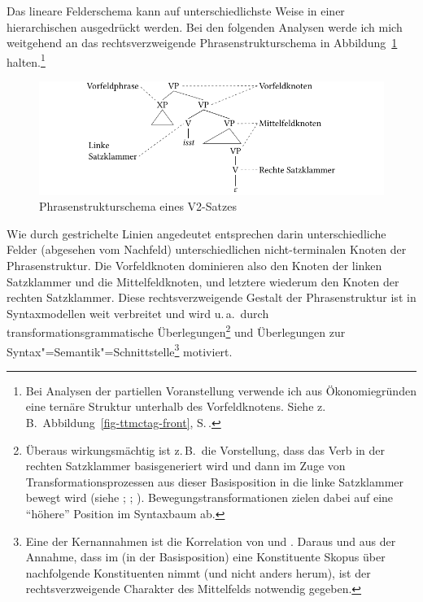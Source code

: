 Das lineare Felderschema kann auf unterschiedlichste Weise in einer hierarchischen  ausgedrückt werden. Bei den folgenden Analysen werde ich mich weitgehend an das rechtsverzweigende Phrasenstrukturschema in Abbildung~\ref{fig-ttmctag-ps-1} halten.\footnote{Bei Analysen der partiellen Voranstellung verwende ich aus Ökonomiegründen eine ternäre Struktur unterhalb des Vorfeldknotens. Siehe z.\,B.\ Abbildung~\ref{fig-ttmctag-front}, S.\,\pageref{fig-ttmctag-front}.}
\begin{figure}[t]
\centering
\includegraphics{graphics/abb75.pdf}
\caption{\label{fig-ttmctag-ps-1} Phrasenstrukturschema eines V2-Satzes}
\end{figure} 
Wie durch gestrichelte Linien angedeutet entsprechen darin unterschiedliche Felder (abgesehen vom Nachfeld) unterschiedlichen nicht-termi\-nalen Knoten der Phrasenstruktur. Die Vorfeldknoten dominieren also den Knoten der linken Satzklammer und die Mittelfeldknoten, und letztere wiederum den Knoten der rechten Satzklammer. Diese rechtsverzweigende Gestalt der Phrasenstruktur ist in Syntaxmodellen weit verbreitet und wird u.\,a.\ durch transformationsgrammatische Überlegungen\footnote{Überaus wirkungsmächtig  ist z.\,B.\ die Vorstellung, dass das Verb in der rechten Satzklammer basisgeneriert wird und dann im Zuge von Transformationsprozessen aus dieser Basisposition in die linke Satzklammer bewegt wird (siehe \citealt[Abschnitt~2.2.2]{Stechow:Sternefeld:88}; \citealt[Abschnitte~III.4 und III.5]{Sternefeld:06}; \citealt[Abschnitt~3.2]{Mueller:10}). Bewegungstransformationen zielen dabei auf eine "`höhere"' Position im Syntaxbaum ab.} und Überlegungen zur Syntax"=Semantik"=Schnittstelle\footnote{Eine der Kernannahmen ist die Korrelation von  und . Daraus und aus der Annahme, dass im  (in der Basisposition) eine Konstituente Skopus über nachfolgende Konstituenten nimmt (und nicht anders herum), ist der rechtsverzweigende Charakter des Mittelfelds notwendig gegeben.%
} motiviert.

